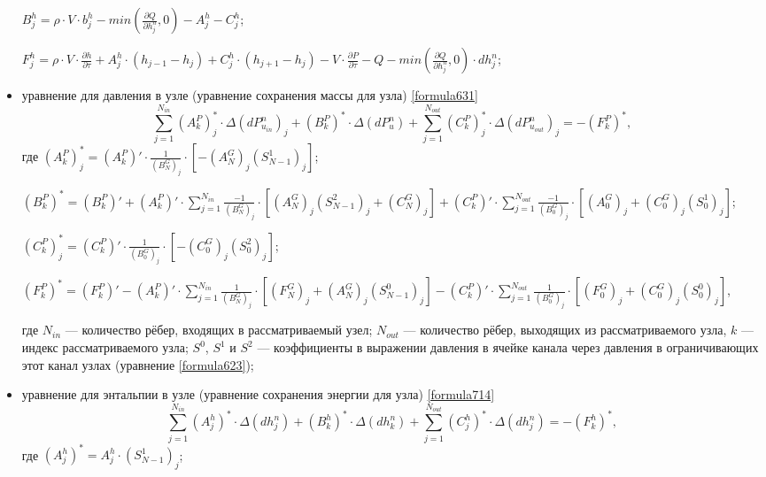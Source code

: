 \begin{itemize}[topsep=5pt, itemsep=-3pt]
\noindent \hspace{0.6cm} $B_j^h = \rho \cdot V \cdot b_j^h - min\left(\frac{\partial Q}{\partial h_j^n},0 \right)-A_j^h-C_j^h$;

\noindent \hspace{0.6cm} $F_j^h = \rho\cdot V\cdot\frac{\partial h}{\partial\tau}+A_j^h\cdot (h_{j-1}-h_j) + C_j^h\cdot (h_{j+1}-h_j)-V\cdot\frac{\partial P}{\partial\tau}-Q-min\left(\frac{\partial Q}{\partial h_j^n},0 \right)\cdot dh_j^n$;

\item уравнение для давления в узле (уравнение сохранения массы для узла) \eqref{formula631}
$$
\sum_{j=1}^{N_{in}} \left(A_k^P \right)_j^{*} \cdot \Delta \left(dP_{u_{in}}^n \right)_j + \left(B_k^P \right)^{*} \cdot \Delta \left(dP_u^n \right) + \sum_{j=1}^{N_{out}} \left(C_k^P \right)_j^{*} \cdot \Delta \left(dP_{u_{out}}^n \right)_j = -\left(F_k^P \right)^{*},
$$
где $\left(A_k^P \right)_j^{*}=\left(A_k^P \right)' \cdot \frac{1}{(B_N^G)_j}\cdot\left[-(A_N^G)_j(S_{N-1}^1)_j\right]$;

\noindent \hspace{0.6cm} $\left(B_k^P \right)^{*}=\left(B_k^P \right)'+\left(A_k^P \right)'\cdot \sum_{j=1}^{N_{in}} \frac{-1}{(B_N^G)_j}\cdot[(A_N^G)_j(S_{N-1}^2)_j+(C_N^G)_j] + \left(C_k^P \right)'\cdot \sum_{j=1}^{N_{out}} \frac{-1}{(B_0^G)_j}\cdot [(A_0^G)_j+(C_0^G)_j(S_0^1)_j]$;

\noindent \hspace{0.6cm} $\left(C_k^P \right)_j^{*}=\left(C_k^P \right)' \cdot \frac{1}{(B_0^G)_j}\cdot\left[-(C_0^G)_j(S_0^2)_j\right]$;

\noindent \hspace{0.6cm} $\left(F_k^P \right)^{*}=\left(F_k^P \right)'-\left(A_k^P \right)'\cdot \sum_{j=1}^{N_{in}} \frac{1}{(B_N^G)_j}\cdot[(F_N^G)_j+(A_N^G)_j(S_{N-1}^0)_j] - \left(C_k^P \right)'\cdot \sum_{j=1}^{N_{out}} \frac{1}{(B_0^G)_j}\cdot [(F_0^G)_j+(C_0^G)_j(S_0^0)_j] $,

\noindent где $N_{in}$ --- количество рёбер, входящих в рассматриваемый узел; $N_{out}$ --- количество рёбер, выходящих из рассматриваемого узла, $k$ --- индекс рассматриваемого узла; $S^0$, $S^1$ и $S^2$ --- коэффициенты в выражении давления в ячейке канала через давления в ограничивающих этот канал узлах (уравнение \eqref{formula623});

\item уравнение для энтальпии в узле (уравнение сохранения энергии для узла) \eqref{formula714}
$$
\sum_{j=1}^{N_{in}} (A_j^h)^{*} \cdot \Delta(dh_j^n) + (B_k^h)^{*} \cdot \Delta(dh_k^n) + \sum_{j=1}^{N_{out}} (C_j^h)^{*} \cdot \Delta(dh_j^n) = -(F_k^h)^{*}, 
$$
где $(A_j^h)^{*} = A_j^h \cdot (S_{N-1}^1)_j$;


\end{itemize}
